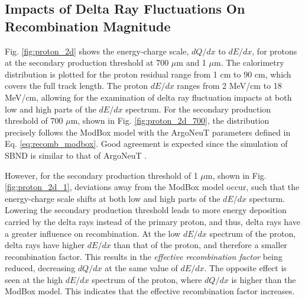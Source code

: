 \subsection{Impacts of Delta Ray Fluctuations On Recombination Magnitude}
\label{sec:impactDeltaRayMag}

Fig. \ref{fig:proton_2d} shows the energy-charge scale, $dQ/dx$ to $dE/dx$, for protons at the secondary production threshold at 700 $\mu$m and 1 $\mu$m.
The calorimetry distribution is plotted for the proton residual range from 1 cm to 90 cm, which covers the full track length. 
The proton $dE/dx$ ranges from 2 MeV/cm to 18 MeV/cm, allowing for the examination of delta ray fluctuation impacts at both low and high parts of the $dE/dx$ spectrum. 
For the secondary production threshold of 700 $\mu$m, shown in Fig. \ref{fig:proton_2d_700}, the distribution precisely follows the ModBox model with the ArgoNeuT parameters defined in Eq. \ref{eq:recomb_modbox}.
Good agreement is expected since the simulation of SBND is similar to that of ArgoNeuT \cite{argoneut_recomb}.

However, for the secondary production threshold of 1 $\mu$m, shown in Fig. \ref{fig:proton_2d_1}, deviations away from the ModBox model occur, such that the energy-charge scale shifts at both low and high parts of the $dE/dx$ specturm. 
Lowering the secondary production threshold leads to more energy deposition carried by the delta rays instead of the primary proton, and thus, delta rays have a greater influence on recombination.
At the low $dE/dx$ spectrum of the proton, delta rays have higher $dE/dx$ than that of the proton, and therefore a smaller recombination factor.
This results in the \textit{effective recombination factor} being reduced, decreasing $dQ/dx$ at the same value of $dE/dx$. 
The opposite effect is seen at the high $dE/dx$ spectrum of the proton, where $dQ/dx$ is higher than the ModBox model.
This indicates that the effective recombination factor increases.

